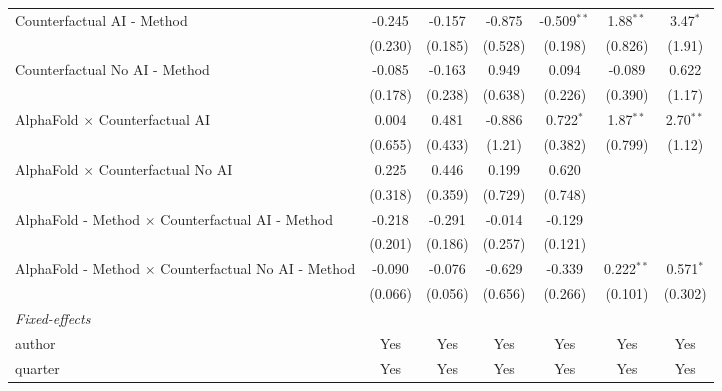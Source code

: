 \begin{tabular}{lcccccc}
   Counterfactual AI - Method                                 & -0.245  & -0.157  & -0.875      & -0.509$^{**}$ & 1.88$^{**}$    & 3.47$^{*}$\\   
                                                              & (0.230) & (0.185) & (0.528)     & (0.198)       & (0.826)        & (1.91)\\   
   Counterfactual No AI - Method                              & -0.085  & -0.163  & 0.949       & 0.094         & -0.089         & 0.622\\   
                                                              & (0.178) & (0.238) & (0.638)     & (0.226)       & (0.390)        & (1.17)\\   
   AlphaFold $\times$ Counterfactual AI                       & 0.004   & 0.481   & -0.886      & 0.722$^{*}$   & 1.87$^{**}$    & 2.70$^{**}$\\   
                                                              & (0.655) & (0.433) & (1.21)      & (0.382)       & (0.799)        & (1.12)\\   
   AlphaFold $\times$ Counterfactual No AI                    & 0.225   & 0.446   & 0.199       & 0.620         &                &   \\   
                                                              & (0.318) & (0.359) & (0.729)     & (0.748)       &                &   \\   
   AlphaFold - Method $\times$ Counterfactual AI - Method     & -0.218  & -0.291  & -0.014      & -0.129        &                &   \\   
                                                              & (0.201) & (0.186) & (0.257)     & (0.121)       &                &   \\   
   AlphaFold - Method $\times$ Counterfactual No AI - Method  & -0.090  & -0.076  & -0.629      & -0.339        & 0.222$^{**}$   & 0.571$^{*}$\\   
                                                              & (0.066) & (0.056) & (0.656)     & (0.266)       & (0.101)        & (0.302)\\   
   \midrule
   \emph{Fixed-effects}\\
   author                                                     & Yes     & Yes     & Yes         & Yes           & Yes            & Yes\\  
   quarter                                                    & Yes     & Yes     & Yes         & Yes           & Yes            & Yes\\  

\end{tabular}
